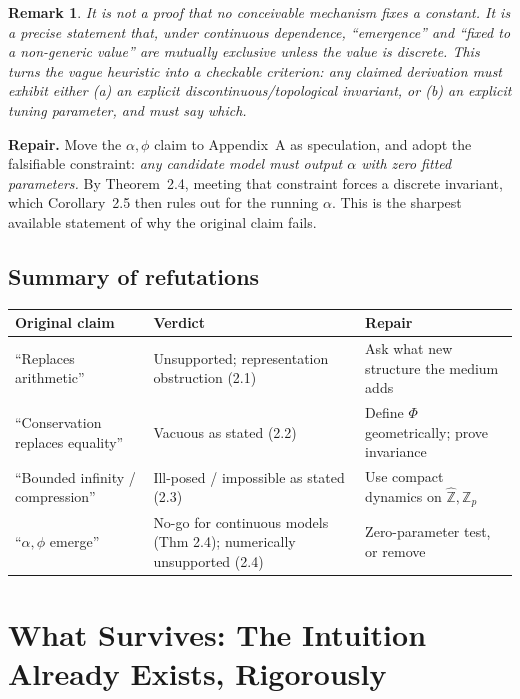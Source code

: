 \documentclass[11pt]{article}
\newtheorem*{remark}{Remark}
\begin{document}
\begin{remark}
It is not a proof that no conceivable mechanism fixes a constant. It is a precise
statement that, \emph{under continuous dependence}, ``emergence'' and ``fixed to a
non-generic value'' are mutually exclusive unless the value is discrete. This
turns the vague heuristic into a checkable criterion: any claimed derivation must
exhibit either (a) an explicit discontinuous/topological invariant, or (b) an
explicit tuning parameter, and must say which.
\end{remark}

\noindent\textbf{Repair.} Move the $\alpha,\phi$ claim to Appendix~A as
speculation, and adopt the falsifiable constraint: \emph{any candidate model must
output $\alpha$ with zero fitted parameters.} By Theorem~2.4, meeting that
constraint forces a discrete invariant, which Corollary~2.5 then rules out for the
running $\alpha$. This is the sharpest available statement of why the original
claim fails.

\subsection{Summary of refutations}

\begin{center}
\renewcommand{\arraystretch}{1.25}
\begin{tabular}{@{}p{4.4cm} p{5.6cm} p{4.6cm}@{}}
\toprule
\textbf{Original claim} & \textbf{Verdict} & \textbf{Repair} \\
\midrule
``Replaces arithmetic'' & Unsupported; representation obstruction (2.1) & Ask what new structure the medium adds \\
``Conservation replaces equality'' & Vacuous as stated (2.2) & Define $\Phi$ geometrically; prove invariance \\
``Bounded infinity / compression'' & Ill-posed / impossible as stated (2.3) & Use compact dynamics on $\hat{\mathbb{Z}},\mathbb{Z}_p$ \\
``$\alpha,\phi$ emerge'' & No-go for continuous models (Thm 2.4); numerically unsupported (2.4) & Zero-parameter test, or remove \\
\bottomrule
\end{tabular}
\end{center}

\section{What Survives: The Intuition Already Exists, Rigorously}
\end{document}
